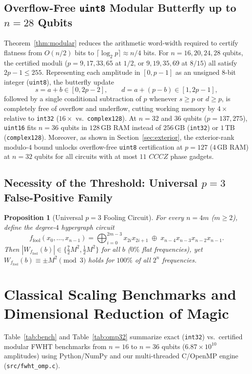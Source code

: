 \documentclass[11pt,a4paper]{article}
\newtheorem{proposition}{Proposition}
\begin{document}
\subsection{Overflow-Free \texttt{uint8} Modular Butterfly up to $n = 28$ Qubits}
Theorem~\ref{thm:modular} reduces the arithmetic word-width required to certify flatness from $O(n/2)$ bits to $\lceil \log_2 p \rceil \approx n/4$ bits. For $n = 16, 20, 24, 28$ qubits, the certified moduli ($p = 9, 17, 33, 65$ at $1/2$, or $9, 19, 35, 69$ at $8/15$) all satisfy $2p - 1 \le 255$. Representing each amplitude in $[0, p-1]$ as an unsigned 8-bit integer (\texttt{uint8}), the butterfly update
\[
  s = a + b \in [0, 2p-2], \qquad
  d = a + (p - b) \in [1, 2p-1],
\]
followed by a single conditional subtraction of $p$ whenever $s \ge p$ or $d \ge p$, is completely free of overflow and underflow, cutting working memory by $4\times$ relative to \texttt{int32} ($16\times$ vs.\ \texttt{complex128}). At $n = 32$ and $36$ qubits ($p = 137, 275$), \texttt{uint16} fits $n = 36$ qubits in $128\,\text{GB}$ RAM instead of $256\,\text{GB}$ (\texttt{int32}) or $1\,\text{TB}$ (\texttt{complex128}). Moreover, as shown in Section~\ref{sec:exterior}, the exterior-rank modulo-$4$ bound unlocks overflow-free \texttt{uint8} certification at $p = 127$ ($4\,\text{GB}$ RAM) at $n = 32$ qubits for all circuits with at most $11$ $CCCZ$ phase gadgets.

\subsection{Necessity of the Threshold: Universal $p=3$ False-Positive Family}
\begin{proposition}[Universal $p=3$ Fooling Circuit]
\label{prop:fool}
For every $n = 4m$ ($m \ge 2$), define the degree-$4$ hypergraph circuit
\[
  f_{\mathrm{fool}}(x_0,\dots,x_{n-1})
  = \bigoplus_{i=0}^{2m-3} x_{2i} x_{2i+1}
  \;\oplus\; x_{n-4}x_{n-3}x_{n-2}x_{n-1}.
\]
Then $|W_{f_{\mathrm{fool}}}(b)| \in \{\frac{7}{2}M^2, \frac{1}{2}M^2\}$ for all $b$ ($0\%$ flat frequencies), yet $W_{f_{\mathrm{fool}}}(b) \equiv \pm M^2 \pmod 3$ holds for $100\%$ of all $2^n$ frequencies.
\end{proposition}

\section{Classical Scaling Benchmarks and Dimensional Reduction of Magic}
\label{sec:benchmarks}

Table~\ref{tab:bench} and Table~\ref{tab:omp32} summarize exact (\texttt{int32}) vs.\ certified modular FWHT benchmarks from $n=16$ to $n=36$ qubits ($6.87\times 10^{10}$ amplitudes) using Python/NumPy and our multi-threaded C/OpenMP engine (\texttt{src/fwht\_omp.c}).
\end{document}
